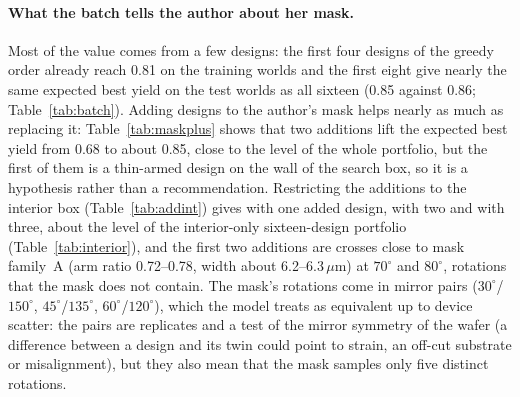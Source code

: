 \paragraph{What the batch tells the author about her mask.} Most of the value comes from a few designs: the first four designs of the greedy order already reach 0.81 on the training worlds and the first eight give nearly the same expected best yield on the test worlds as all sixteen (0.85 against 0.86; Table~\ref{tab:batch}).
Adding designs to the author's mask helps nearly as much as replacing it: Table~\ref{tab:maskplus} shows that two additions lift the expected best yield from 0.68 to about 0.85, close to the level of the whole portfolio, but the first of them is a thin-armed design on the wall of the search box, so it is a hypothesis rather than a recommendation.
Restricting the additions to the interior box (Table~\ref{tab:addint}) gives \intPlusOne{} with one added design, \intPlusTwo{} with two and \intPlusThree{} with three, about the level of the interior-only sixteen-design portfolio (Table~\ref{tab:interior}), and the first two additions are crosses close to mask family~A (arm ratio 0.72--0.78, width about 6.2--6.3\,$\mu$m) at $70^\circ$ and $80^\circ$, rotations that the mask does not contain.
The mask's rotations come in mirror pairs ($30^\circ$/$150^\circ$, $45^\circ$/$135^\circ$, $60^\circ$/$120^\circ$), which the model treats as equivalent up to device scatter: the pairs are replicates and a test of the mirror symmetry of the wafer (a difference between a design and its twin could point to strain, an off-cut substrate or misalignment), but they also mean that the mask samples only five distinct rotations.
\begin{table}[H]\centering\small\tabAddInterior\caption{Additions to the author's mask restricted to the interior box, in the order of the greedy choice (chosen on the training worlds, scored on the test worlds).}\label{tab:addint}\end{table}
